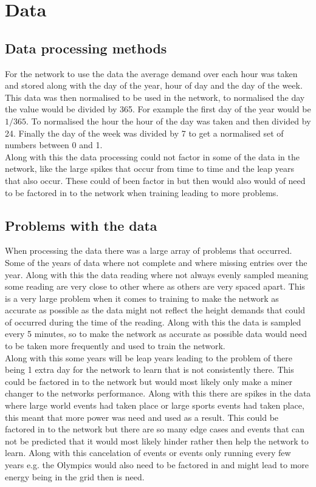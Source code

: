 \documentclass{IEEEtran}
\begin{document}
\section{Data}
\subsection{Data processing methods}
\begin{flushleft}
  For the network to use the data the average demand over each hour was taken and stored
  along with the day of the year, hour of day and the day of the week. This data was then
  normalised to be used in the network, to normalised the day the value would be divided by
  365. For example the first day of the year would be $1 / 365$. To normalised the hour the
  hour of the day was taken and then divided by 24. Finally the day of the week was divided
  by 7 to get a normalised set of numbers between 0 and 1.
  \\
  \vspace{1.5mm}
  Along with this the data processing could not factor in some of the data in the network, like
  the large spikes that occur from time to time and the leap years that also occur. These could
  of been factor in but then would also would of need to be factored in to the network when training
  leading to more problems.
\end{flushleft}
\subsection{Problems with the data}
\begin{flushleft}
  When processing the data there was a large array of problems that occurred. Some of the years of data where not
  complete and where missing entries over the year. Along with this the data reading where not always evenly sampled
  meaning some reading are very close to other where as others are very spaced apart. This is a very large problem when
  it comes to training to make the network as accurate as possible as the data might not reflect the height demands that
  could of occurred during the time of the reading. Along with this the data is sampled every 5 minutes, so to make the
  network as accurate as possible data would need to be taken more frequently and used to train the network.
  \\
  \vspace{1.5mm}
  Along with this some years will be leap years leading to the problem of there being 1 extra day for the network to
  learn that is not consistently there. This could be factored in to the network but would most likely only make a miner
  changer to the networks performance. Along with this there are spikes in the data where large world events had taken
  place or large sports events had taken place, this meant that more power was need and used as a result.
  This could be factored in to the network but there are so many edge cases and events that can not be predicted that
  it would most likely hinder rather then help the network to learn. Along with this cancelation of events or events only
  running every few years e.g. the Olympics would also need to be factored in and might lead to more energy being in the
  grid then is need.
\end{flushleft}
\end{document}
